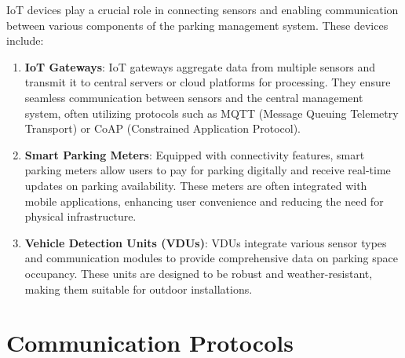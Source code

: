 \documentclass[oneside, 12pt, a4paper, draft]{book}
\begin{document}
\begin{enumerate}
IoT devices play a crucial role in connecting sensors and enabling communication between various components of the parking management system. These devices include:

\begin{enumerate}
\item \textbf{IoT Gateways}: IoT gateways aggregate data from multiple sensors and transmit it to central servers or cloud platforms for processing. They ensure seamless communication between sensors and the central management system, often utilizing protocols such as MQTT (Message Queuing Telemetry Transport) or CoAP (Constrained Application Protocol).

\item \textbf{Smart Parking Meters}: Equipped with connectivity features, smart parking meters allow users to pay for parking digitally and receive real-time updates on parking availability. These meters are often integrated with mobile applications, enhancing user convenience and reducing the need for physical infrastructure.

\item \textbf{Vehicle Detection Units (VDUs)}: VDUs integrate various sensor types and communication modules to provide comprehensive data on parking space occupancy. These units are designed to be robust and weather-resistant, making them suitable for outdoor installations.
\end{enumerate}
\end{enumerate}
\section{Communication Protocols}
\label{sec:org749711b}
\end{document}
